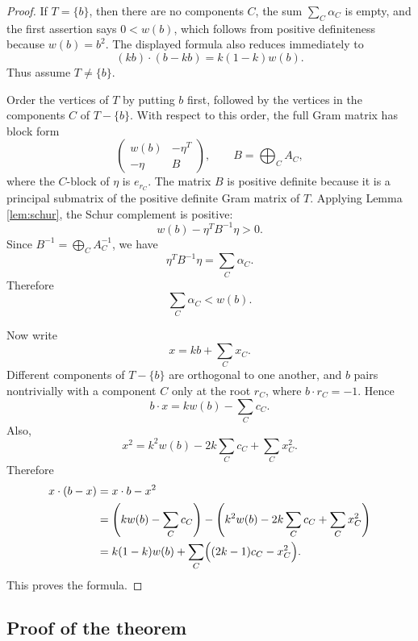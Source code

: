 \documentclass[12pt]{article}
\begin{document}
\begin{proof}
If \(T=\{b\}\), then there are no components \(C\), the sum \(\sum_C\alpha_C\) is empty, and the first assertion says \(0<w(b)\), which follows from positive definiteness because \(w(b)=b^2\). The displayed formula also reduces immediately to
\[
(kb)\cdot(b-kb)=k(1-k)w(b).
\]
Thus assume \(T\ne \{b\}\).

Order the vertices of \(T\) by putting \(b\) first, followed by the vertices in the components \(C\) of \(T-\{b\}\). With respect to this order, the full Gram matrix has block form
\[
\begin{pmatrix}
w(b) & -\eta^T\\
-\eta & B
\end{pmatrix},
\qquad
B=\bigoplus_C A_C,
\]
where the \(C\)-block of \(\eta\) is \(e_{r_C}\). The matrix \(B\) is positive definite because it is a principal submatrix of the positive definite Gram matrix of \(T\). Applying Lemma \ref{lem:schur}, the Schur complement is positive:
\[
w(b)-\eta^TB^{-1}\eta>0.
\]
Since \(B^{-1}=\bigoplus_C A_C^{-1}\), we have
\[
\eta^TB^{-1}\eta=\sum_C \alpha_C.
\]
Therefore
\[
\sum_C\alpha_C<w(b).
\]

Now write
\[
x=kb+\sum_C x_C.
\]
Different components of \(T-\{b\}\) are orthogonal to one another, and \(b\) pairs nontrivially with a component \(C\) only at the root \(r_C\), where \(b\cdot r_C=-1\). Hence
\[
b\cdot x=kw(b)-\sum_C c_C.
\]
Also,
\[
x^2
=
k^2w(b)-2k\sum_C c_C+\sum_C x_C^2.
\]
Therefore
\[
\begin{aligned}
x\cdot(b-x)
&=x\cdot b-x^2\\
&=
\left(kw(b)-\sum_C c_C\right)
-
\left(k^2w(b)-2k\sum_C c_C+\sum_C x_C^2\right)\\
&=
k(1-k)w(b)
+
\sum_C\Bigl((2k-1)c_C-x_C^2\Bigr).
\end{aligned}
\]
This proves the formula.
\end{proof}

\subsection*{Proof of the theorem}
\end{document}
